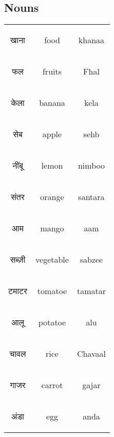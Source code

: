 \subsection{Nouns}
\begin{table}[H]
    \centering
    \begin{tabular}{c|c|c}
        \begin{hindi} खाना \end{hindi} & food & khanaa \\
        \begin{hindi} फल \end{hindi} & fruits & Fhal \\ 
        \begin{hindi} केला \end{hindi} & banana & kela \\
        \begin{hindi} सेब \end{hindi} & apple & sehb \\
        \begin{hindi} नींबू \end{hindi} & lemon & nimboo \\
        \begin{hindi} संतर \end{hindi} & orange & santara \\
        \begin{hindi} आम \end{hindi} & mango & aam \\ 
        \begin{hindi} सब्ज़ी \end{hindi} & vegetable & sabzee \\ 
        \begin{hindi} टमाटर \end{hindi} & tomatoe & tamatar \\
        \begin{hindi} आलू \end{hindi} & potatoe & alu \\
        \begin{hindi} चावल \end{hindi} & rice & Chavaal \\
        \begin{hindi} गाजर \end{hindi} & carrot & gajar \\ 
        \begin{hindi} अंडा \end{hindi} & egg & anda \\

\end{tabular}
\end{table}
